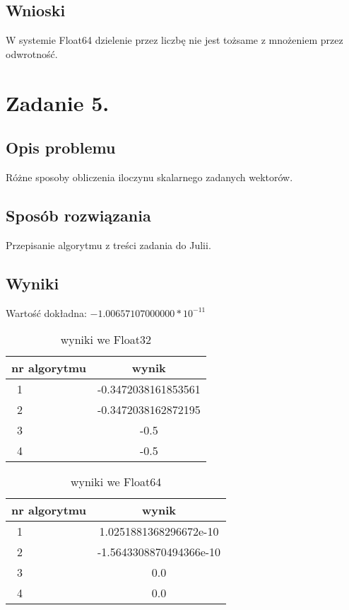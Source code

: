 \documentclass[12pt]{article}
\begin{document}
\subsection{Wnioski}
W systemie Float64 dzielenie przez liczbę nie jest tożsame z mnożeniem przez odwrotność.

\section{Zadanie 5.}

\subsection{Opis problemu}
Różne sposoby obliczenia iloczynu skalarnego zadanych wektorów.
\subsection{Sposób rozwiązania}
Przepisanie algorytmu z treści zadania do Julii.
\newpage
\subsection{Wyniki}
Wartość dokładna: $-1.00657107000000 * {10^{-11}}$
\begin{table}[h]
    \caption{wyniki we Float32}
    \label{vectors}
    \centering
    \begin{tabular}{|l|c|}
        \hline 
        \textbf{nr algorytmu} & \textbf{wynik} \\
        \hline
        \ 1 & -0.3472038161853561\\
        \hline
        \ 2 & -0.3472038162872195\\
        \hline
        \ 3 & -0.5\\
        \hline
        \ 4 & -0.5\\
        \hline
    \end{tabular} 
\end{table}
\begin{table}[h]
    \caption{wyniki we Float64}
    \label{vectors2}
    \centering
    \begin{tabular}{|l|c|}
        \hline 
        \textbf{nr algorytmu} & \textbf{wynik} \\
        \hline
        \ 1 & 1.0251881368296672e-10\\
        \hline
        \ 2 & -1.5643308870494366e-10\\
        \hline
        \ 3 & 0.0\\
        \hline
        \ 4 & 0.0\\
        \hline
    \end{tabular} 
\end{table}
\end{document}

